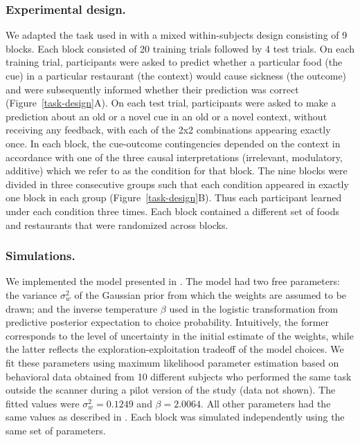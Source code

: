 \documentclass[10pt,letterpaper]{article}
\begin{document}
\subsubsection{Experimental design.} 

We adapted the task used in  with a mixed within-subjects design consisting of 9 blocks. Each block consisted of 20 training trials followed by 4 test trials. On each training trial, participants were asked to predict whether a particular food (the cue) in a particular restaurant (the context) would cause sickness (the outcome) and were subsequently informed whether their prediction was correct (Figure~\ref{task-design}A). On each test trial, participants were asked to make a prediction about an old or a novel cue in an old or a novel context, without receiving any feedback, with each of the 2x2 combinations appearing exactly once. In each block, the cue-outcome contingencies depended on the context in accordance with one of the three causal interpretations (irrelevant, modulatory, additive) which we refer to as the condition for that block. The nine blocks were divided in three consecutive groups such that each condition appeared in exactly one block in each group (Figure~\ref{task-design}B). Thus each participant learned under each condition three times. Each block contained a different set of foods and restaurants that were randomized across blocks.
\\

\subsubsection{Simulations.} 

We implemented the model presented in . The model had two free parameters: the variance $\sigma^2_w$ of the Gaussian prior from which the weights are assumed to be drawn; and the inverse temperature $\beta$ used in the logistic transformation from predictive posterior expectation to choice probability. Intuitively, the former corresponds to the level of uncertainty in the initial estimate of the weights, while the latter reflects the exploration-exploitation tradeoff of the model choices. We fit these parameters using maximum likelihood parameter estimation based on behavioral data obtained from 10 different subjects who performed the same task outside the scanner during a pilot version of the study (data not shown). The fitted values were $\sigma^2_w = 0.1249$ and $\beta = 2.0064$. All other parameters had the same values as described in . Each block was simulated independently using the same set of parameters.
\end{document}

